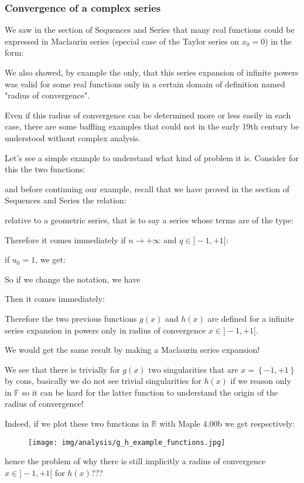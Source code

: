 	\pagebreak
	\subsubsection{Convergence of a complex series}
	We saw in the section of Sequences and Series that many real functions could be expressed in Maclaurin series (special case of the Taylor series on $x_0=0$) in the form:
	
	We also showed, by example the only, that this series expansion of infinite powers was valid for some real functions only in a certain domain of definition named "radius of convergence".
	
	Even if this radius of convergence can be determined more or less easily in each case, there are some baffling examples that could not in the early 19th century be understood without complex analysis.
	
	Let's see a simple example to understand what kind of problem it is. Consider for this the two functions:
	
	and before continuing our example, recall that we have proved in the section of Sequences and Series the relation:
	
	relative to a geometric series, that is to say a series whose terms are of the type:
	
	Therefore it comes immediately if $n \rightarrow +\infty$ and $q \in ]-1,+1[$:
	
	if $u_0=1$, we get:
	
	So if we change the notation, we have\label{sum of powers}
	
	Then it comes immediately:
	
	Therefore the two previous functions $g(x)$ and $h(x)$ are defined for a infinite series expansion in powers only in radius of convergence $x \in ]-1,+1[$.
	
	We would get the same result by making a Maclaurin series expansion!
	
	We see that there is trivially for $g(x)$ two singularities that are $x=\left\lbrace -1,+1\right\rbrace$ by cons, basically we do not see trivial singularities for $h (x)$ if we reason only in $\mathbb{F}$ so it can be hard for the latter function to understand the origin of the radius of convergence!
	
	Indeed, if we plot these two functions in $\mathbb{R}$ with Maple 4.00b we get respectively:
	\begin{figure}[H]
		\begin{center}
			\texttt{[image: img/analysis/g\_h\_example\_functions.jpg]}
		\end{center}
	\end{figure}
	hence the problem of why there is still implicitly a radius of convergence $x \in ]-1,+1[$ for $h (x)$???
	
